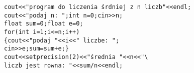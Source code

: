 \begin{verbatim}
cout<<"program do liczenia śrdniej z n liczb"<<endl;
cout<<"podaj n: ";int n=0;cin>>n;
float sum=0;float e=0;
for(int i=1;i<=n;i++)
{cout<<"podaj "<<i<<" liczbe: ";
cin>>e;sum=sum+e;}
cout<<setprecision(2)<<"średnia "<<n<<"\
liczb jest rowna: "<<sum/n<<endl;
\end{verbatim}